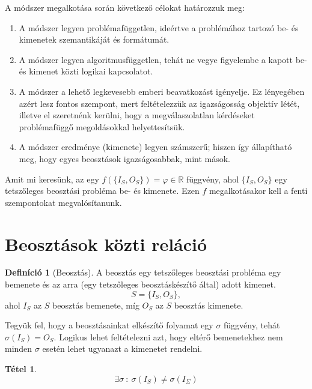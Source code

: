 \documentclass[twocolumn]{article}
\theoremstyle{definition}
\newtheorem{definition}{Definíció}[section]
\newtheorem{theorem}{Tétel}[section]
\newcommand{\set}[1]{ \{ {#1} \} }
\begin{document}
    A módszer megalkotása során következő célokat határozzuk meg:
    \begin{enumerate}
        \item A módszer legyen problémafüggetlen, ideértve a problémához tartozó be- és kimenetek szemantikáját és formátumát.
        \item A módszer legyen algoritmusfüggetlen, tehát ne vegye figyelembe a kapott be- és kimenet közti logikai kapcsolatot.
        \item A módszer a lehető legkevesebb emberi beavatkozást igényelje. Ez lényegében azért lesz fontos szempont, mert feltételezzük az igazságosság objektív létét, illetve el szeretnénk kerülni, hogy a megválaszolatlan kérdéseket problémafüggő megoldásokkal helyettesítsük.
        \item A módszer eredménye (kimenete) legyen számszerű; hiszen így állapítható meg, hogy egyes beosztások igazságosabbak, mint mások.
    \end{enumerate}
    
    Amit mi keresünk, az egy $f( \set{ I_S, O_S }) = \varphi \in \mathbb{R}$ függvény, ahol $\set{I_S, O_S}$ egy tetszőleges beosztási probléma be- és kimenete. Ezen $f$ megalkotásakor kell a fenti szempontokat megvalósítanunk.

\section{Beosztások közti reláció}
    
    \begin{definition}[Beosztás]
        A beosztás egy tetszőleges beosztási probléma egy bemenete és az arra (egy tetszőleges beosztáskészítő által) adott kimenet.
        \begin{equation} S = \set{I_S, O_S},\end{equation} 
        ahol $I_S$ az $S$ beosztás bemenete, míg $O_S$ az $S$ beosztás kimenete.

    \end{definition}
    
    Tegyük fel, hogy a beosztásainkat elkészítő folyamat egy $\sigma$ függvény, tehát $\sigma(I_S) = O_S$. Logikus lehet feltételezni azt, hogy eltérő bemenetekhez nem minden $\sigma$ esetén lehet ugyanazt a kimenetet rendelni.
    

    \begin{theorem}
        \begin{equation}
            \exists \sigma \ : \ 
            \sigma(I_S)
            \not= 
            \sigma(I_\Sigma)
        \end{equation}
    \end{theorem}
    
\end{document}
